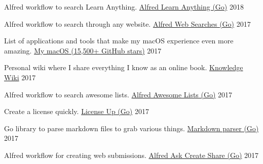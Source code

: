 
\begin{cventries}

  \cventry
    {Alfred workflow to search Learn Anything.}
    {\href{https://github.com/nikitavoloboev/alfred-learn-anything}{Alfred Learn Anything (Go)}}
    {}
    {2018}
    {
    }

    \cventry
    {Alfred workflow to search through any website.}
    {\href{https://github.com/nikitavoloboev/alfred-web-searches}{Alfred Web Searches (Go)}}
    {}
    {2017}
    {
    }

    \cventry
    {List of applications and tools that make my macOS experience even more amazing.}
    {\href{https://github.com/nikitavoloboev/my-mac-os}{My macOS (15,500+ GitHub stars)}}
    {}
    {2017}
    {
    }

    \cventry
    {Personal wiki where I share everything I know as an online book.}
    {\href{https://wiki.nikitavoloboev.xyz}{Knowledge Wiki}}
    {}
    {2017}
    {
    }

    \cventry
    {Alfred workflow to search awesome lists.}
    {\href{https://github.com/nikitavoloboev/alfred-awesome-lists}{Alfred Awesome Lists (Go)}}
    {}
    {2017}
    {
    }

    \cventry
    {Create a license quickly.}
    {\href{https://github.com/nikitavoloboev/license-up}{License Up (Go)}}
    {}
    {2017}
    {
    }

    \cventry
    {Go library to parse markdown files to grab various things.}
    {\href{https://github.com/nikitavoloboev/markdown-parser}{Markdown parser (Go)}}
    {}
    {2017}
    {
    }

    \cventry
    {Alfred workflow for creating web submissions.}
    {\href{https://github.com/nikitavoloboev/alfred-ask-create-share}{Alfred Ask Create Share (Go)}}
    {}
    {2017}
    {
    }

\end{cventries}
